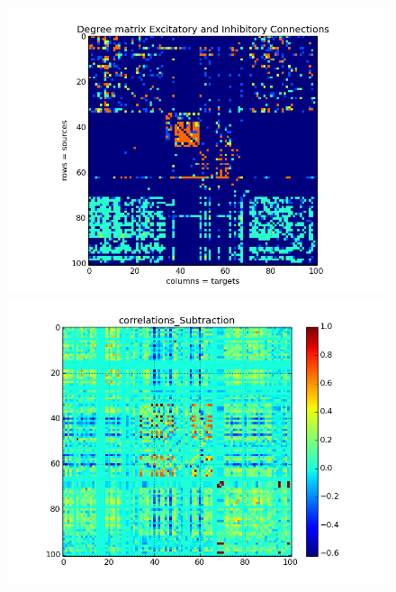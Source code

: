 \documentclass{beamer}
\begin{document}
\begin{frame}



\begin{figure}
\begin{minipage}{0.45\linewidth}
\centering
\includegraphics[scale=0.24]{Both_transmitters_degree_matrix0_0500_012501_00_01009_010_0.png}

\end{minipage}
\begin{minipage}{0.45\linewidth}
\centering
\includegraphics[scale=0.301]{correlations0_0500_012501_00_010013_010_0.png}

\end{minipage}
\end{figure}

\end{frame}
\end{document}
